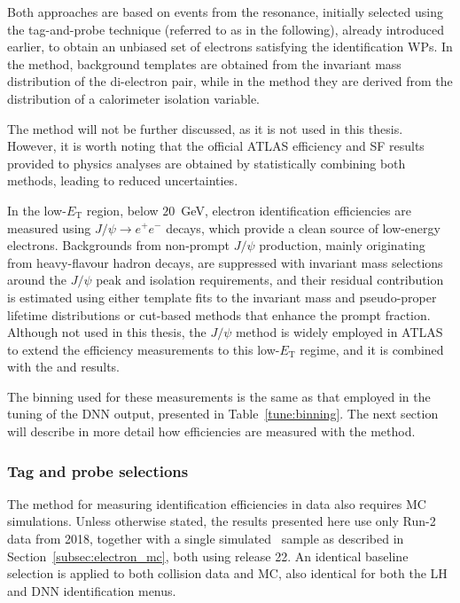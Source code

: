Both approaches are based on events from the \zee resonance, initially selected using the tag-and-probe technique (referred to as \tp in the following), already introduced earlier, to obtain an unbiased set of electrons satisfying the identification WPs. In the \zmass method, background templates are obtained from the invariant mass distribution of the di-electron pair, while in the \ziso method they are derived from the distribution of a calorimeter isolation variable.

The \ziso method will not be further discussed, as it is not used in this thesis. However, it is worth noting that the official ATLAS efficiency and SF results provided to physics analyses are obtained by statistically combining both methods, leading to reduced uncertainties. 

In the low-$E_{\mathrm{T}}$ region, below $20$~GeV, electron identification efficiencies are measured using $J/\psi \to e^+e^-$ decays, which provide a clean source of low-energy electrons. Backgrounds from non-prompt $J/\psi$ production, mainly originating from heavy-flavour hadron decays, are suppressed with invariant mass selections around the $J/\psi$ peak and isolation requirements, and their residual contribution is estimated using either template fits to the invariant mass and pseudo-proper lifetime distributions or cut-based methods that enhance the prompt fraction. Although not used in this thesis, the $J/\psi$ method is widely employed in ATLAS to extend the efficiency measurements to this low-$E_{\mathrm{T}}$ regime, and it is combined with the \zmass and \ziso results.

The binning used for these measurements is the same as that employed in the tuning of the DNN output, presented in Table~\ref{tune:binning}. The next section will describe in more detail how efficiencies are measured with the \zmass method.

\subsubsection{Tag and probe selections}

The \zmass method for measuring identification efficiencies in data also requires MC simulations. Unless otherwise stated, the results presented here use only Run-2 data from 2018, together with a single simulated \zee\ sample as described in Section~\ref{subsec:electron_mc}, both using release 22. An identical baseline selection is applied to both collision data and MC, also identical for both the LH and DNN identification menus.

